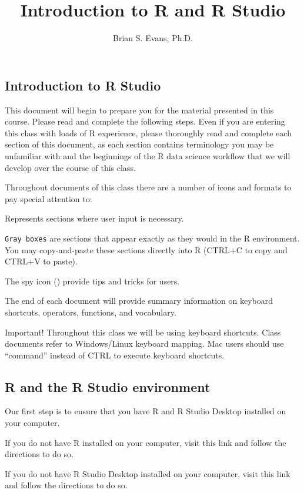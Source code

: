 \documentclass[]{article}
\title{Introduction to R and R Studio}
\author{Brian S. Evans, Ph.D.}
\date{}
\begin{document}
\maketitle

\subsection{Introduction to R Studio}\label{introduction-to-r-studio}

This document will begin to prepare you for the material presented in
this course. Please read and complete the following steps. Even if you
are entering this class with loads of R experience, please thoroughly
read and complete each section of this document, as each section
contains terminology you may be unfamiliar with and the beginnings of
the R data science workflow that we will develop over the course of this
class.

Throughout documents of this class there are a number of icons and
formats to pay special attention to:

 Represents sections where user input is necessary.

\texttt{Gray\ boxes} are sections that appear exactly as they would in
the R environment. You may copy-and-paste these sections directly into R
(CTRL+C to copy and CTRL+V to paste).

The spy icon () provide tips and tricks for users.

The end of each document will provide summary information on keyboard
shortcuts, operators, functions, and vocabulary.

Important! Throughout this class we will be using keyboard shortcuts.
Class documents refer to Windows/Linux keyboard mapping. Mac users
should use ``command'' instead of CTRL to execute keyboard shortcuts.

\subsection{R and the R Studio
environment}\label{r-and-the-r-studio-environment}

 Our first step is to ensure that you have R and R Studio Desktop
installed on your computer.

If you do not have R installed on your computer, visit this link and
follow the directions to do so.

If you do not have R Studio Desktop installed on your computer, visit
this link and follow the directions to do so.
\end{document}

